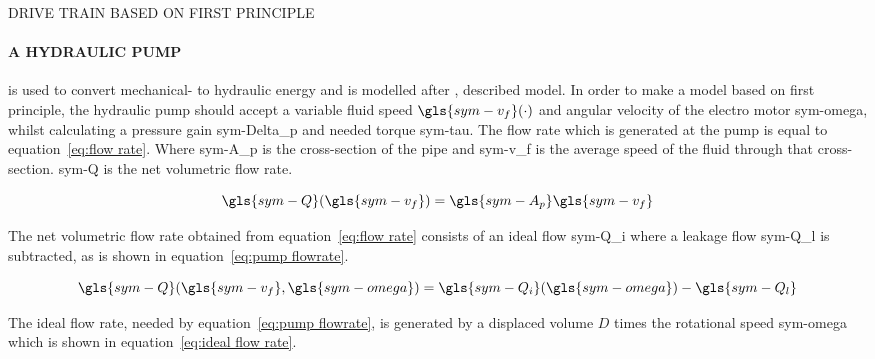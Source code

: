 \begin{RoyalFigure}[!htb, label=fig:propulsionsystemmodel]{DRIVE TRAIN BASED ON FIRST PRINCIPLE}
\end{RoyalFigure}
\newpage

\paragraph{A HYDRAULIC PUMP} is used to convert mechanical- to hydraulic energy and is modelled after
\citet{mathworks_mechanical_hydraulic_2016}, described model. In order to make a model based on first principle, the
hydraulic pump should accept a variable fluid speed \( \gls{sym-v_f}(\cdot) \) and angular velocity of the electro
motor \gls{sym-omega}, whilst calculating a pressure gain \gls{sym-Delta_p} and needed torque \gls{sym-tau}. The flow
rate which is generated at the pump is equal to equation~\ref{eq:flow rate}. Where \gls{sym-A_p} is the cross-section of
the pipe and \gls{sym-v_f} is the average speed of the fluid through that cross-section. \gls{sym-Q} is the net
volumetric flow rate.

\begin{equation}
    \label{eq:flow rate}
    \gls{sym-Q}(\gls{sym-v_f}) = \gls{sym-A_p} \gls{sym-v_f}
\end{equation}

\noindent The net volumetric flow rate obtained from equation~\ref{eq:flow rate} consists of an ideal flow
\gls{sym-Q_i} where a leakage flow \gls{sym-Q_l} is subtracted, as is shown in equation~\ref{eq:pump flowrate}.

\begin{equation}
    \label{eq:pump flowrate}
    \gls{sym-Q}(\gls{sym-v_f}, \gls{sym-omega}) = \gls{sym-Q_i}(\gls{sym-omega}) - \gls{sym-Q_l}
\end{equation}

\noindent The ideal flow rate, needed by equation~\ref{eq:pump flowrate}, is generated by a displaced volume \( D \)
times the rotational speed \gls{sym-omega} which is shown in equation~\ref{eq:ideal flow rate}.

